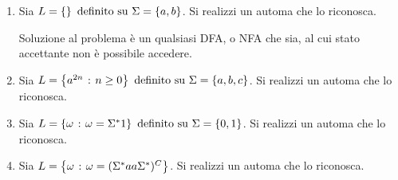 \documentclass{subfiles}
\begin{document}
\begin{enumerate}
    \item Sia \(L = \Set{} \text{definito su} \Sigma = \Set{a, b}\). Si realizzi un automa che lo riconosca.
          

          \begin{Note*}
              Soluzione al problema è un qualsiasi DFA, o NFA che sia, al cui stato accettante non è possibile accedere.
          \end{Note*}

    \item Sia \(L = \set{a^{2n}}{n \ge 0} \text{definito su} \Sigma = \Set{a, b, c}\). Si realizzi un automa che lo riconosca.
          

    \item Sia \(L = \set{\omega}{\omega = \Sigma^{*}1} \text{definito su} \Sigma = \Set{0, 1}\). Si realizzi un automa che lo riconosca.
          

    \item Sia \(L = \left\{\omega \operatorname{\: {:} \:} \omega = (\Sigma^{*} aa \Sigma^{*})^{C}\right\}\). Si realizzi un automa che lo riconosca.
          
\end{enumerate}
\clearpage
\end{document}
